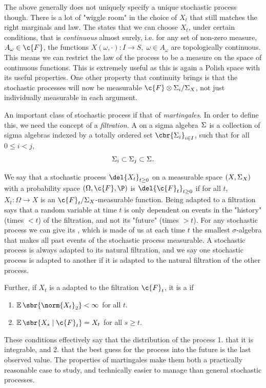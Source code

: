 The above generally does not uniquely specify a unique stochastic process though.
There is a lot of "wiggle room" in the choice of \(X_t\) that still matches the right marginals and law.
The  states that we can choose \(X_t\), under certain conditions, that is \emph{continuous} almost surely, i.e. for any set of non-zero measure, \(A_\omega \in \c{F}\), the functions \(X(\omega, \cdot): I\to S, \; \omega\in A_\omega\) are topologically continuous.
This means we can restrict the law of the process to be a measure on the space of continuous functions.
This is extremely useful as this is again a Polish space with its useful properties.
One other property that continuity brings is that the stochastic processes will now be measurable \(\c{{F}}\otimes\Sigma_i / \Sigma_X\), not just individually measurable in each argument.

An important class of stochastic process if that of \emph{martingales}.
In order to define this, we need the concept of a \emph{filtration}.
A  on a sigma algebra \(\Sigma_{}\) is a collection of sigma algebras indexed by a totally ordered set \(\cbr{\sigalg{i}}_{i \in I}\), such that for all \(0 \leq i < j\), \[\Sigma_{i} \subset \Sigma_{j} \subset \Sigma_{}.\]

We say that a stochastic process \(\del{X_t}_{t\geq 0}\) on a measurable space \((X, \Sigma_{X})\) with a probability space \((\Omega, \c{F}, \P)\) is  \(\del{\c{F}_t}_{t\geq 0}\) if for all \(t\), \(X_t: \Omega \to X\) is an \(\c{F}_t/\sigalg{X}\)-measurable function.
Being adapted to a filtration says that a random variable at time \(t\) is only dependent on events in the "history" (times \( < t\)) of the filtration, and not its "future" (times \( > t\)).
For any stochastic process we can give its , which is made of us at each time \(t\) the smallest \(\sigma\)-algebra that makes all past events of the stochastic process measurable.
A stochastic process is always adapted to its natural filtration, and we say one stochastic process is adapted to another if it is adapted to the natural filtration of the other process.

Further, if \(X_t\) is a adapted to the filtration \(\c{F}_t\), it is a  if 
\begin{enumerate}[noitemsep]
	\item \(\E\sbr{\norm{X_t}_2} < \infty\) for all \(t\).
	\item \(\E\sbr{X_s \given \c{F}_t} = X_t\) for all \(s \geq t\).
\end{enumerate}
These conditions effectively say that the distribution of the process 1. that it is integrable, and 2. that the best guess for the process into the future is the last observed value.
The properties of martingales make them both a practically reasonable case to study, and technically easier to manage than general stochastic processes.


